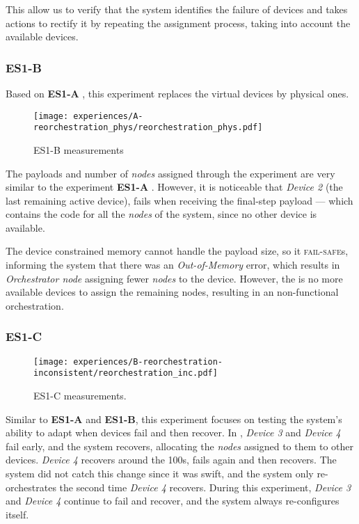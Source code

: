 This allow us to verify that the system identifies the failure of devices and takes actions to rectify it by repeating the assignment process, taking into account the available devices.


\subsubsection{ES1-B}

Based on \textbf{ES1-A} , this experiment replaces the virtual devices by physical ones. 

\begin{figure}[h]
    \centering
    \texttt{[image: experiences/A-reorchestration\_phys/reorchestration\_phys.pdf]}
    \caption{ES1-B measurements}
    \label{fig:experiment_a_phys_graph}
\end{figure}

The payloads and number of \textit{nodes} assigned through the experiment are very similar to the experiment \textbf{ES1-A} . However, it is noticeable that \textit{Device 2} (the last remaining active device), fails when receiving the final-step payload --- which contains the code for all the \textit{nodes} of the system, since no other device is available. 

The device constrained memory cannot handle the payload size, so it \textsc{fail-safe}s, informing the system that there was an \textit{Out-of-Memory} error, which results in \textit{Orchestrator node} assigning fewer \textit{nodes} to the device. However, the is no more available devices to assign the remaining nodes, resulting in an non-functional orchestration.


\subsubsection{ES1-C}

\begin{figure}[h]
    \centering
    \texttt{[image: experiences/B-reorchestration-inconsistent/reorchestration\_inc.pdf]}
    \caption[ES1-C measurements]{ES1-C measurements.}
    \label{fig:experiment_b_graph}
\end{figure}

Similar to \textbf{ES1-A} and \textbf{ES1-B}, this experiment focuses on testing the system's ability to adapt when devices fail and then recover. In , \textit{Device 3} and \textit{Device 4} fail early, and the system recovers, allocating the \textit{nodes} assigned to them to other devices. \textit{Device 4} recovers around the 100s, fails again and then recovers. The system did not catch this change since it was swift, and the system only re-orchestrates the second time \textit{Device 4} recovers. During this experiment, \textit{Device 3} and \textit{Device 4} continue to fail and recover, and the system always re-configures itself.

